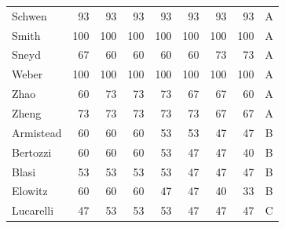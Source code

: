 {\begin{longtable}{@{}lrrrrrrrc@{}}
Schwen & 93 & 93 & 93 & 93 & 93 & 93 & 93 & A \\
Smith & 100 & 100 & 100 & 100 & 100 & 100 & 100 & A \\
Sneyd & 67 & 60 & 60 & 60 & 60 & 73 & 73 & A \\
Weber & 100 & 100 & 100 & 100 & 100 & 100 & 100 & A \\
Zhao & 60 & 73 & 73 & 73 & 67 & 67 & 60 & A \\
Zheng & 73 & 73 & 73 & 73 & 73 & 67 & 67 & A \\
Armistead & 60 & 60 & 60 & 53 & 53 & 47 & 47 & B \\
Bertozzi & 60 & 60 & 60 & 53 & 47 & 47 & 40 & B \\
Blasi & 53 & 53 & 53 & 53 & 47 & 47 & 47 & B \\
Elowitz & 60 & 60 & 60 & 47 & 47 & 40 & 33 & B \\
Lucarelli & 47 & 53 & 53 & 53 & 47 & 47 & 47 & C \\
\bottomrule \end{longtable}}

